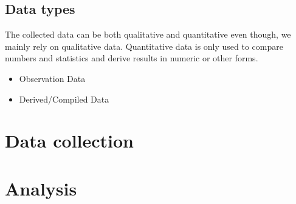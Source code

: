 \documentclass[]{report}
\begin{document}
\subsection{Data types}
The collected data can be both qualitative and quantitative even though, we mainly rely on qualitative data.
Quantitative data is only used to compare numbers and statistics and derive results in numeric or other forms.
\begin{itemize}
	\item Observation Data
	\item Derived/Compiled Data
\end{itemize}
\section{Data collection}
\section{Analysis}
\end{document}
